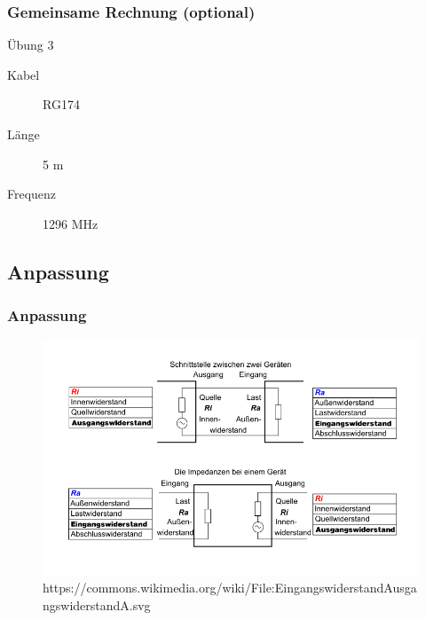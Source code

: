 \begin{frame}
\frametitle{Gemeinsame Rechnung (optional)}
\begin{exampleblock}{Übung 3}
  \begin{description}
 	\item[Kabel] RG174
 	\item[Länge] 5 m
 	\item[Frequenz] 1296 MHz
  \end{description}
\end{exampleblock}
\end{frame}


\subsection*{Anpassung}
\begin{frame}
\frametitle{Anpassung}
\begin{center}
\begin{figure}
\includegraphics[width=1\textwidth,height=.7\textheight,keepaspectratio]{e10/Anpassung.png}
                    {https://commons.wikimedia.org/wiki/File:EingangswiderstandAusgangswiderstandA.svg}{\ccpd}
\end{figure}
\end{center}
\end{frame}

